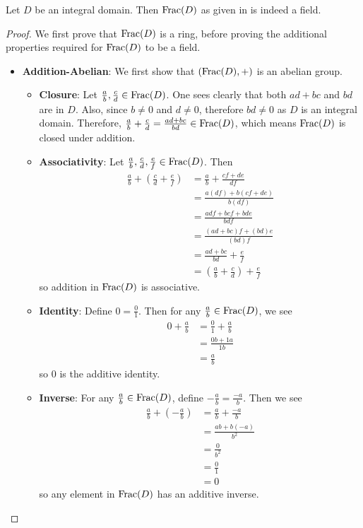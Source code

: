 \begin{proposition}
    Let $D$ be an integral domain. Then $\mathrm{Frac}(D)$ as given in  is indeed a field.
\end{proposition}
\begin{proof}
    We first prove that $\mathrm{Frac}(D)$ is a ring, before proving the additional properties required for $\mathrm{Frac}(D)$ to be a field.
    \begin{itemize}
        \item \textbf{Addition-Abelian}: We first show that $(\mathrm{Frac}(D), +)$ is an abelian group.
        \begin{itemize}
            \item \textbf{Closure}: Let $\frac ab, \frac cd \in \mathrm{Frac}(D)$. One sees clearly that both $ad + bc$ and $bd$ are in $D$. Also, since $b \neq 0$ and $d \neq 0$, therefore $bd \neq 0$ as $D$ is an integral domain. Therefore, $\frac ab + \frac cd = \frac{ad + bc}{bd} \in \mathrm{Frac}(D)$, which means $\mathrm{Frac}(D)$ is closed under addition.

            \item \textbf{Associativity}: Let $\frac ab, \frac cd, \frac ef \in \mathrm{Frac}(D)$. Then
            \begin{align*}
                \frac ab + \left(\frac cd + \frac ef\right) &= \frac ab + \frac {cf + de}{df}\\
                &= \frac{a(df) + b(cf + de)}{b(df)}\\
                &= \frac{adf + bcf + bde}{bdf}\\
                &= \frac{(ad + bc)f + (bd)e}{(bd)f}\\
                &= \frac{ad+bc}{bd} + \frac ef\\
                &= \left(\frac ab + \frac cd\right) + \frac ef
            \end{align*}
            so addition in $\mathrm{Frac}(D)$ is associative.

            \item \textbf{Identity}: Define $0 = \frac 01$. Then for any $\frac ab \in \mathrm{Frac}(D)$, we see
            \begin{align*}
                0 + \frac ab &= \frac 01 + \frac ab\\
                &= \frac{0b + 1a}{1b}\\
                &= \frac ab
            \end{align*}
            so 0 is the additive identity.

            \item \textbf{Inverse}: For any $\frac ab \in \mathrm{Frac}(D)$, define $-\frac ab = \frac{-a}b$. Then we see
            \begin{align*}
                \frac ab + \left(-\frac ab\right) &= \frac ab + \frac{-a}b\\
                &= \frac{ab + b(-a)}{b^2}\\
                &= \frac 0{b^2}\\
                &= \frac 01\\
                &= 0
            \end{align*}
            so any element in $\mathrm{Frac}(D)$ has an additive inverse.


\end{itemize}
\end{itemize}
\end{proof}
